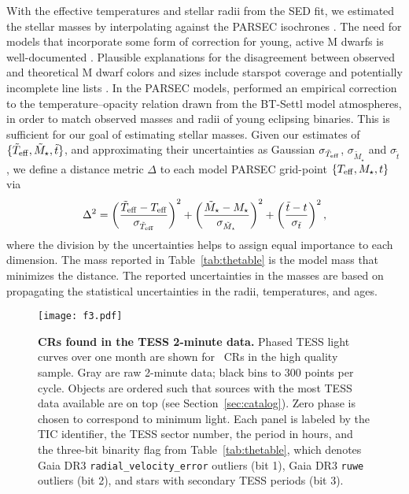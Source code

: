 \documentclass[11pt,twocolumn,tighten]{aastex63}
\begin{document}
With the effective temperatures and stellar radii from the SED fit, we
estimated the stellar masses by interpolating against the PARSEC
isochrones \citep[v1.2S][]{2014MNRAS.444.2525C}.  The need for models
that incorporate some form of correction for young, active M dwarfs is
well-documented
\citep[e.g.][]{2012ApJ...756...47S,2015ApJ...804..146D,2016A&A...593A..99F,2020ApJ...891...29S}.
Plausible explanations for the disagreement between observed and
theoretical M dwarf colors and sizes include starspot coverage
\citep[e.g.][]{2017ApJ...836..200G} and potentially incomplete line
lists \citep[e.g.][]{2013A&A...556A..15R}.  In the PARSEC models,
\citet{2014MNRAS.444.2525C} performed an empirical correction to the
temperature--opacity relation drawn from the BT-Settl model
atmospheres, in order to match observed masses and radii of young
eclipsing binaries.  This is sufficient for our goal of estimating
stellar masses.  Given our estimates of $\{ \tilde{T}_{\rm eff},
\tilde{M}_\star, \tilde{t} \}$, and approximating their uncertainties
as Gaussian $\sigma_{\tilde{T}_{\rm eff}}$, $\sigma_{\tilde{M}_\star}$
and $\sigma_{\tilde{t}}$, we define a distance metric $\Delta$ to each
model PARSEC grid-point $\{ T_{\rm eff}, M_\star, t \}$ via
\begin{equation}
  \Delta^2 = 
  \left( \frac{\tilde{T}_{\rm eff} - T_{\rm eff}}{\sigma_{\tilde{T}_{\rm eff}}} \right)^2
  +
  \left( \frac{\tilde{M}_{\star} - M_{\star}}{\sigma_{\tilde{M}_{\star}}} \right)^2
  +
  \left( \frac{\tilde{t} - t}{\sigma_{\tilde{t}}} \right)^2,
\end{equation}
where the division by the uncertainties helps to assign equal
importance to each dimension.  The mass reported in
Table~\ref{tab:thetable} is the model mass that minimizes the
distance.  The reported uncertainties in the masses are based on
propagating the statistical uncertainties in the radii, temperatures,
and ages.


\begin{figure*}[!tp]
	\begin{center}
		\centering
		\texttt{[image: f3.pdf]}
    \vspace{-0.3cm}
		\caption{
      {\bf CRs found in the TESS 2-minute data.}
      Phased TESS light curves over one month are shown for \ngoods\
      CRs in the high quality sample.  Gray are raw 2-minute data;
      black bins to 300 points per cycle.  Objects are ordered such
      that sources with the most TESS data available are on top (see
      Section~\ref{sec:catalog}).  Zero phase is chosen to correspond
      to minimum light.  Each panel is labeled by the TIC identifier,
      the TESS sector number, the period in hours, and the three-bit
      binarity flag from Table~\ref{tab:thetable}, which denotes Gaia
      DR3 \texttt{radial\_velocity\_error} outliers (bit 1), Gaia DR3
      \texttt{ruwe} outliers (bit 2), and stars with secondary TESS
      periods (bit 3). 
		}
		\label{fig:cqvs}
	\end{center}
\end{figure*}
\end{document}
